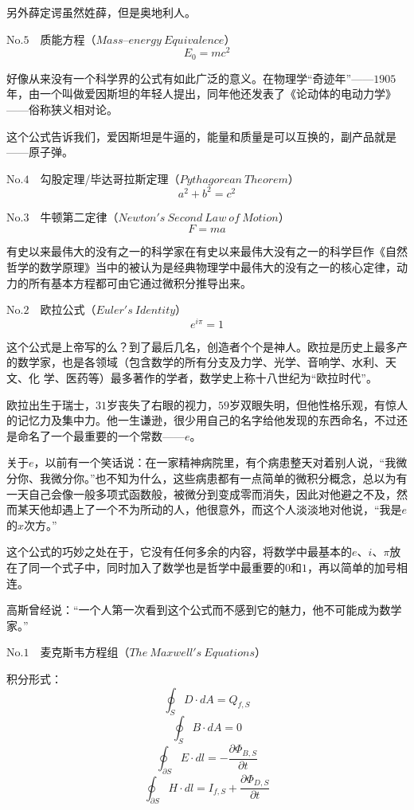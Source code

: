 另外薛定谔虽然姓薛，但是奥地利人。

No.$5\quad$质能方程（$Mass–energy\  Equivalence$）$$E_0=mc^2$$

好像从来没有一个科学界的公式有如此广泛的意义。在物理学“奇迹年”——$1905$年，由一个叫做爱因斯坦的年轻人提出，同年他还发表了《论动体的电动力学》——俗称狭义相对论。

这个公式告诉我们，爱因斯坦是牛逼的，能量和质量是可以互换的，副产品就是——原子弹。

No.$4\quad$勾股定理/毕达哥拉斯定理（$Pythagorean\ Theorem$）$$a^2+b^2=c^2$$

No.$3\quad$牛顿第二定律（$Newton's\  Second\  Law\  of\  Motion$）$$F=ma$$

有史以来最伟大的没有之一的科学家在有史以来最伟大没有之一的科学巨作《自然哲学的数学原理》当中的被认为是经典物理学中最伟大的没有之一的核心定律，动力的所有基本方程都可由它通过微积分推导出来。

No.$2\quad$欧拉公式（$Euler's\  Identity$）$$e^{i\pi}=1$$

这个公式是上帝写的么？到了最后几名，创造者个个是神人。欧拉是历史上最多产的数学家，也是各领域（包含数学的所有分支及力学、光学、音响学、水利、天文、化 学、医药等）最多著作的学者，数学史上称十八世纪为“欧拉时代”。

欧拉出生于瑞士，$31$岁丧失了右眼的视力，$59$岁双眼失明，但他性格乐观，有惊人的记忆力及集中力。他一生谦逊，很少用自己的名字给他发现的东西命名，不过还是命名了一个最重要的一个常数——$e$。

关于$e$，以前有一个笑话说：在一家精神病院里，有个病患整天对着别人说，“我微分你、我微分你。”也不知为什么，这些病患都有一点简单的微积分概念，总以为有一天自己会像一般多项式函数般，被微分到变成零而消失，因此对他避之不及，然而某天他却遇上了一个不为所动的人，他很意外，而这个人淡淡地对他说，“我是$e$的$x$次方。”

这个公式的巧妙之处在于，它没有任何多余的内容，将数学中最基本的$e$、$i$、$\pi$放在了同一个式子中，同时加入了数学也是哲学中最重要的$0$和$1$，再以简单的加号相连。

高斯曾经说：“一个人第一次看到这个公式而不感到它的魅力，他不可能成为数学家。”

No.$1\quad$麦克斯韦方程组（$The\  Maxwell's\  Equations$）

积分形式：$$\displaystyle\oint\nolimits_{S}D\cdot dA=Q_{f,S}$$
$$\displaystyle\oint\nolimits_{S}B\cdot dA=0$$
$$\displaystyle\oint\nolimits_{\displaystyle\partial S}E\cdot dl=-\displaystyle\frac{\displaystyle\partial \Phi_{B,S}}{\displaystyle\partial t}$$
$$\displaystyle\oint\nolimits_{\displaystyle\partial S}H\cdot dl=I_{f,S}+\displaystyle\frac{\displaystyle\partial \Phi_{D,S}}{\displaystyle\partial t}$$


